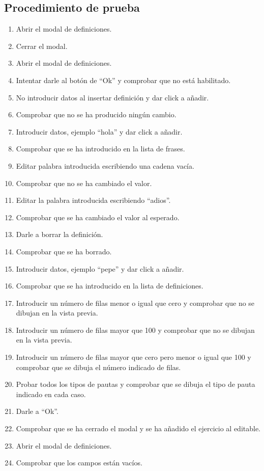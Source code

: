 \subsection{Procedimiento de prueba}
\label{procedimientoPruebas:definiciones}
\begin{enumerate}
\item Abrir el modal de definiciones.
\item Cerrar el modal.
\item Abrir el modal de definiciones.
\item Intentar darle al botón de ``Ok'' y comprobar que no está habilitado.
\item No introducir datos al insertar definición y dar click a añadir.
\item Comprobar que no se ha producido ningún cambio.
\item Introducir datos, ejemplo ``hola'' y dar click a añadir.
\item Comprobar que se ha introducido en la lista de frases.
\item Editar palabra introducida escribiendo una cadena vacía.
\item Comprobar que no se ha cambiado el valor.
\item Editar la palabra introducida escribiendo ``adios''.
\item Comprobar que se ha cambiado el valor al esperado.
\item Darle a borrar la definición.
\item Comprobar que se ha borrado.
\item Introducir datos, ejemplo ``pepe'' y dar click a añadir.
\item Comprobar que se ha introducido en la lista de definiciones.
\item Introducir un número de filas menor o igual que cero y comprobar que no se dibujan en la vista previa.
\item Introducir un número de filas mayor que 100 y comprobar que no se dibujan en la vista previa.
\item Introducir un número de filas mayor que cero pero menor o igual que 100 y comprobar que se dibuja el número indicado de filas.
\item Probar todos los tipos de pautas y comprobar que se dibuja el tipo de pauta indicado en cada caso.
\item Darle a ``Ok''.
\item Comprobar que se ha cerrado el modal y se ha añadido el ejercicio al editable.
\item Abrir el modal de definiciones.
\item Comprobar que los campos están vacíos.
\end{enumerate}

